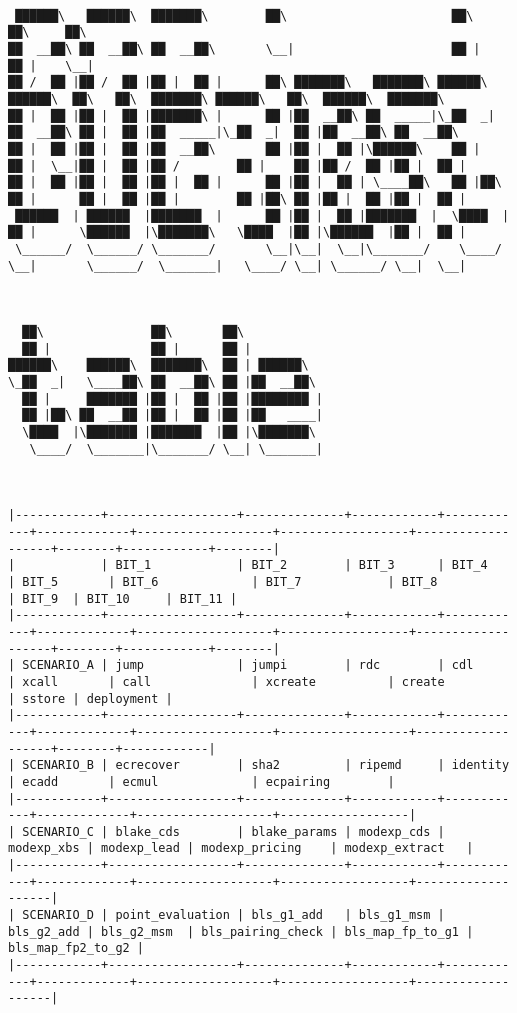 \documentclass[varwidth=\maxdimen,margin=0.5cm,multi={verbatim}]{standalone}
\begin{document}
\begin{verbatim}

 ██████\   ██████\  ███████\        ██\                       ██\                                     ██\     ██\
██  __██\ ██  __██\ ██  __██\       \__|                      ██ |                                    ██ |    \__|
██ /  ██ |██ /  ██ |██ |  ██ |      ██\ ███████\   ███████\ ██████\    ██████\  ██\   ██\  ███████\ ██████\   ██\  ██████\  ███████\
██ |  ██ |██ |  ██ |███████\ |      ██ |██  __██\ ██  _____|\_██  _|  ██  __██\ ██ |  ██ |██  _____|\_██  _|  ██ |██  __██\ ██  __██\
██ |  ██ |██ |  ██ |██  __██\       ██ |██ |  ██ |\██████\    ██ |    ██ |  \__|██ |  ██ |██ /        ██ |    ██ |██ /  ██ |██ |  ██ |
██ |  ██ |██ |  ██ |██ |  ██ |      ██ |██ |  ██ | \____██\   ██ |██\ ██ |      ██ |  ██ |██ |        ██ |██\ ██ |██ |  ██ |██ |  ██ |
 ██████  | ██████  |███████  |      ██ |██ |  ██ |███████  |  \████  |██ |      \██████  |\███████\   \████  |██ |\██████  |██ |  ██ |
 \______/  \______/ \_______/       \__|\__|  \__|\_______/    \____/ \__|       \______/  \_______|   \____/ \__| \______/ \__|  \__|



  ██\               ██\       ██\
  ██ |              ██ |      ██ |
██████\    ██████\  ███████\  ██ | ██████\
\_██  _|   \____██\ ██  __██\ ██ |██  __██\
  ██ |     ███████ |██ |  ██ |██ |████████ |
  ██ |██\ ██  __██ |██ |  ██ |██ |██   ____|
  \████  |\███████ |███████  |██ |\███████\
   \____/  \_______|\_______/ \__| \_______|



|------------+------------------+--------------+------------+------------+-------------+-------------------+------------------+-------------------+--------+------------+--------|
|            | BIT_1            | BIT_2        | BIT_3      | BIT_4      | BIT_5       | BIT_6             | BIT_7            | BIT_8             | BIT_9  | BIT_10     | BIT_11 |
|------------+------------------+--------------+------------+------------+-------------+-------------------+------------------+-------------------+--------+------------+--------|
| SCENARIO_A | jump             | jumpi        | rdc        | cdl        | xcall       | call              | xcreate          | create            | sstore | deployment |
|------------+------------------+--------------+------------+------------+-------------+-------------------+------------------+-------------------+--------+------------|
| SCENARIO_B | ecrecover        | sha2         | ripemd     | identity   | ecadd       | ecmul             | ecpairing        |
|------------+------------------+--------------+------------+------------+-------------+-------------------+------------------|
| SCENARIO_C | blake_cds        | blake_params | modexp_cds | modexp_xbs | modexp_lead | modexp_pricing    | modexp_extract   |
|------------+------------------+--------------+------------+------------+-------------+-------------------+------------------+-------------------|
| SCENARIO_D | point_evaluation | bls_g1_add   | bls_g1_msm | bls_g2_add | bls_g2_msm  | bls_pairing_check | bls_map_fp_to_g1 | bls_map_fp2_to_g2 |
|------------+------------------+--------------+------------+------------+-------------+-------------------+------------------+-------------------|



\end{verbatim}
\end{document}

